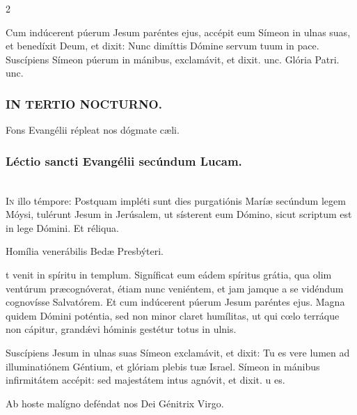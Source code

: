 \documentclass[9pt,twoside]{extarticle}
\begin{document}
\begin{multicols}{2}
\begin{tightlist}{}
\item {} Cum indúcerent púerum Jesum paréntes ejus, accépit eum Símeon in ulnas suas, et benedíxit Deum, et dixit: \textred{*} Nunc dimíttis Dómine servum tuum in pace.  Suscípiens Símeon púerum in mánibus, exclamávit, et dixit. unc. Glória Patri. unc.
\end{tightlist}

\subsubsection*{\center \textsc{IN TERTIO NOCTURNO.}}
\begin{tightlist}{}
\item {\small {} Fons Evangélii répleat nos dógmate cæli.}
\end{tightlist}
\subsubsection*{\center Léctio sancti Evangélii secúndum Lucam.}
\\
\lettrine{I}n illo témpore: Postquam impléti sunt dies purgatiónis Maríæ secúndum legem Móysi, tulérunt Jesum in Jerúsalem, ut sísterent eum Dómino, sicut scriptum est in lege Dómini. Et réliqua.

\begin{center}Homília venerábilis Bedæ Presbýteri.\\
\end{center}
t venit in spíritu in templum. Signíficat eum eádem spíritus grátia, qua olim ventúrum præcognóverat, étiam nunc veniéntem, et jam jamque a se vidéndum cognovísse Salvatórem. Et cum indúcerent púerum Jesum paréntes ejus. Magna quidem Dómini poténtia, sed non minor claret humílitas, ut qui cœlo terráque non cápitur, grandǽvi hóminis gestétur totus in ulnis. 

\begin{tightlist}{}
\item {} Suscípiens Jesum in ulnas suas Símeon exclamávit, et dixit: \textred{*} Tu es vere lumen ad illuminatiónem Géntium, et glóriam plebis tuæ Israel.  Símeon in mánibus infirmitátem accépit: sed majestátem intus agnóvit, et dixit. u es.
\item {\small {} Ab hoste malígno deféndat nos Dei Génitrix Virgo.}
\end{tightlist}


\end{multicols}
\end{document}
